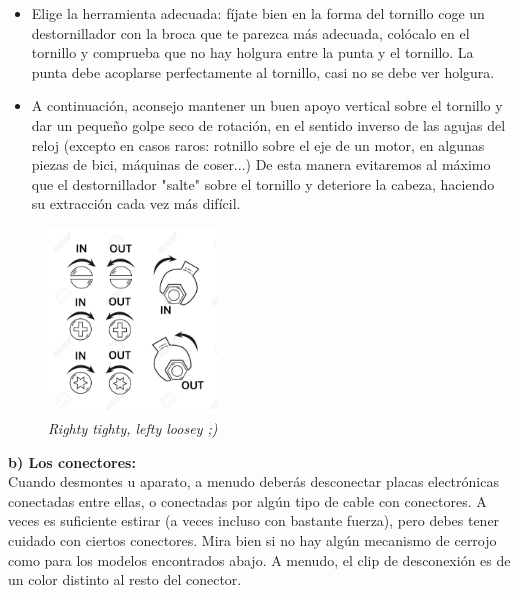 \documentclass[a5paper,twoside,openany]{book}
\begin{document}
\begin{itemize}
\item Elige la herramienta adecuada: fíjate bien en la forma del tornillo
coge un destornillador con la broca que te parezca más adecuada, colócalo en el tornillo y comprueba que no hay holgura entre la punta y el tornillo.
La punta debe acoplarse perfectamente al tornillo, casi no se debe ver holgura.
\item A continuación, aconsejo mantener un buen apoyo vertical sobre el tornillo y dar un pequeño golpe seco de rotación, en el sentido inverso de las agujas del reloj (excepto en casos raros: rotnillo sobre el eje de un motor, en algunas piezas de bici, máquinas de coser...)
De esta manera evitaremos al máximo que el destornillador "salte" sobre el tornillo y deteriore la cabeza, haciendo su extracción cada vez más difícil.
\end{itemize}
\begin{figure}[h]
\includegraphics[width=0.4\textwidth]{diagrama-righty-tighty} 
\centering
\caption*{\textit{Righty tighty, lefty loosey ;)}}
\end{figure}

{\large \textbf{b) Los conectores:}}\\
Cuando desmontes u aparato, a menudo deberás desconectar placas electrónicas conectadas entre ellas, o conectadas por algún tipo de cable con conectores. A veces es suficiente estirar (a veces incluso con bastante fuerza), pero debes tener cuidado con ciertos conectores. Mira bien si no hay algún mecanismo de cerrojo como para los modelos encontrados abajo. A menudo, el clip de desconexión es de un color distinto al resto del conector.
\end{document}
